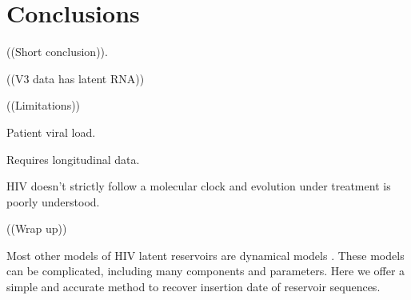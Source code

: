 \documentclass[12pt,onecolumn,twoside]{pnas-new}
\begin{document}
\section*{Conclusions}
((Short conclusion)).

((V3 data has latent RNA))

((Limitations))

Patient viral load.

Requires longitudinal data.

HIV doesn't strictly follow a molecular clock and evolution under treatment is poorly understood.

((Wrap up))

Most other models of HIV latent reservoirs are dynamical models \cite{Rong09,Pace11}.
These models can be complicated, including many components and parameters.
Here we offer a simple and accurate method to recover insertion date of reservoir sequences.
\end{document}
